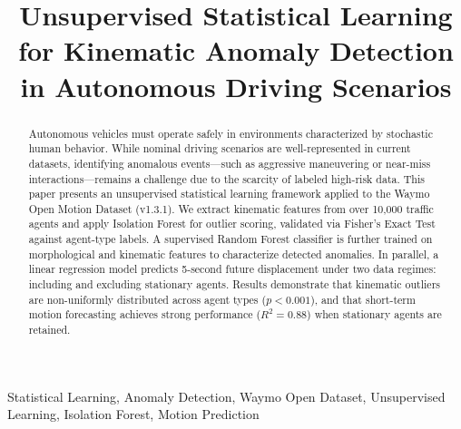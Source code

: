 \documentclass[conference]{IEEEtran}
\begin{document}
\title{Unsupervised Statistical Learning for Kinematic Anomaly Detection in Autonomous Driving Scenarios}

\author{
\and
{}
\and
{}
}

\maketitle

\begin{abstract}
Autonomous vehicles must operate safely in environments characterized by stochastic human behavior. While nominal driving scenarios are well-represented in current datasets, identifying anomalous events---such as aggressive maneuvering or near-miss interactions---remains a challenge due to the scarcity of labeled high-risk data. This paper presents an unsupervised statistical learning framework applied to the Waymo Open Motion Dataset (v1.3.1). We extract kinematic features from over 10{,}000 traffic agents and apply Isolation Forest for outlier scoring, validated via Fisher's Exact Test against agent-type labels. A supervised Random Forest classifier is further trained on morphological and kinematic features to characterize detected anomalies. In parallel, a linear regression model predicts 5-second future displacement under two data regimes: including and excluding stationary agents. Results demonstrate that kinematic outliers are non-uniformly distributed across agent types ($p < 0.001$), and that short-term motion forecasting achieves strong performance ($R^2 = 0.88$) when stationary agents are retained.
\end{abstract}

\begin{IEEEkeywords}
Statistical Learning, Anomaly Detection, Waymo Open Dataset, Unsupervised Learning, Isolation Forest, Motion Prediction
\end{IEEEkeywords}
\end{document}
